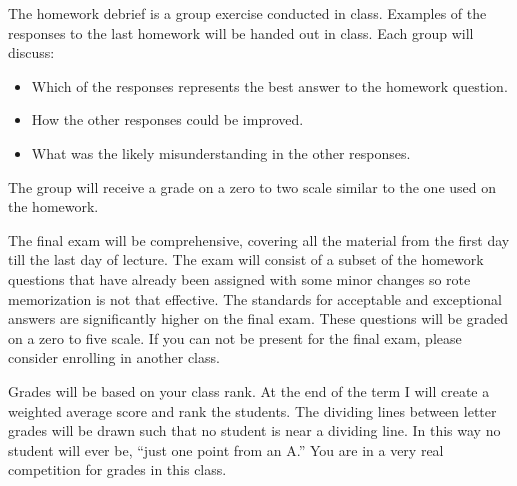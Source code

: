\documentclass[letterpaper,10pt]{article}
\begin{document}
The homework debrief is a group exercise conducted in class. Examples of the responses to the last homework will be handed out in class.  Each group will discuss:

\begin{itemize}
\item Which of the responses represents the best answer to the homework question.
\item How the other responses could be improved.
\item What was the likely misunderstanding in the other responses.
\end{itemize}

The group will receive a grade on a zero to two scale similar to the one used on the homework.

The final exam will be comprehensive, covering all the material from the first day till the last day of lecture. The exam will consist of a subset of the homework questions that have already been assigned with some minor changes so rote memorization is not that effective.  The standards for acceptable and exceptional answers are significantly higher on the final exam.  These questions will be graded on a zero to five scale.  If you can not be present for the final exam, please consider enrolling in another class.


Grades will be based on your class rank. At the end of the term I will
create a weighted average score and rank the students. The dividing
lines between letter grades will be drawn such that no student is near
a dividing line. In this way no student will ever be, ``just one point
from an A.'' You are in a very real competition for grades in this
class. 
\end{document}
